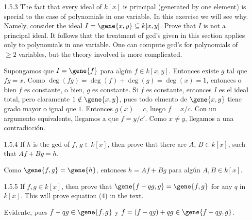 \documentclass[twoside]{article}
\begin{document}
\begin{ejercicio}{1.5.3}
The fact that every ideal of $k[x]$ is principal (generated by one element) is special to the case of polynomials in one variable.
In this exercise we will see why.
Namely, consider the ideal $I=\gene{x,y} \subseteq k[x,y]$.
Prove that $I$ is not a principal ideal.
It follows that the treatment of gcd’s given in this section applies only to polynomials in one variable.
One can compute gcd’s for polynomials of $≥ 2$ variables, but the theory involved is more complicated.
\end{ejercicio}
\begin{solucion}
Supongamos que $I = \gene{f}$ para algún $f \in k[x,y]$.
Entonces existe $g$ tal que $fg = x$.
Como $\deg(fg) = \deg(f) + \deg(g) = \deg(x) = 1$, entonces o bien $f$ es constante, o bien, $g$ es constante.
Si $f$ es constante, entonces $I$ es el ideal total, pero claramente $1 \notin \gene{x,y}$, pues todo elmento de $\gene{x,y}$ tiene grado mayor o igual que $1$.
Entonces $g(x) = c$, luego $f = x/c$.
Con un argumento equivalente, llegamos a que $f = y/c'$.
Como $x \neq y$, llegamos a una contradicción.
\end{solucion}

\newpage

\begin{ejercicio}{1.5.4}
If $h$ is the gcd of $f$, $g \in k[x]$, then prove that there are $A$, $B \in k[x]$, such that $A f + B g = h$.
\end{ejercicio}
\begin{solucion}
Como $\gene{f,g} = \gene{h}$, entonces $h = A f + B g$ para algún $A, B \in k[x]$.
\end{solucion}

\newpage

\begin{ejercicio}{1.5.5}
If $f,g \in k[x]$, then prove that $\gene{f-qg,g} = \gene{f,g}$ for any $q$ in $k[x]$.
This will prove equation (4) in the text.
\end{ejercicio}
\begin{solucion}
Evidente, pues $f-qg \in \gene{f,g}$ y $f = (f-qg)+qg \in \gene{f-qg,g}$.
\end{solucion}
\end{document}
